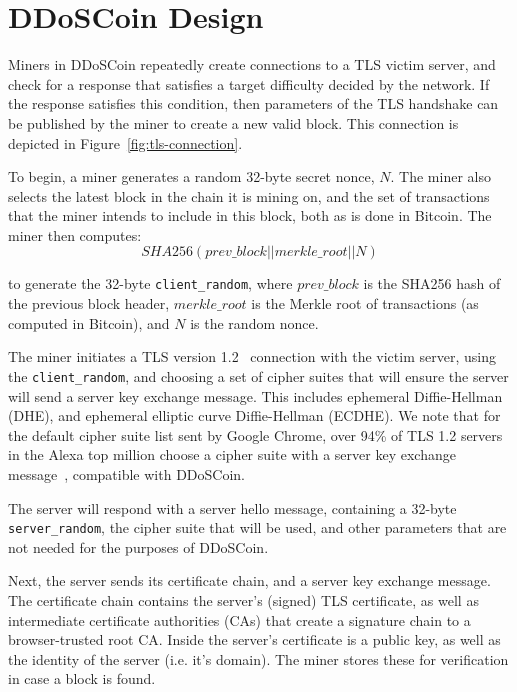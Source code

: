 \section{DDoSCoin Design}
\FigTLS

\FigOverview

Miners in DDoSCoin repeatedly create connections to a TLS victim server, and
check for a response that satisfies a target difficulty decided by the network.
If the response satisfies this condition, then parameters of the TLS handshake
can be published by the miner to create a new valid block. This connection is
depicted in Figure~\ref{fig:tls-connection}.

To begin, a miner generates a random 32-byte secret nonce, $N$. The miner also
selects the latest block in the chain it is mining on, and the set of
transactions that the miner intends to include in this block, both as is done in
Bitcoin. The miner then computes:
\begin{equation}
SHA256(prev\_block || merkle\_root || N)
\end{equation}

to generate the 32-byte \texttt{client\_random}, where $prev\_block$ is
the SHA256 hash of the previous block header, $merkle\_root$ is the
Merkle root of transactions (as computed in Bitcoin), and $N$ is the random nonce.

The miner initiates a TLS version 1.2~\cite{rfc5246} connection with the victim
server, using the \texttt{client\_random}, and choosing a set of cipher suites
that will ensure the server will send a server key exchange message. This
includes ephemeral Diffie-Hellman (DHE), and ephemeral elliptic curve
Diffie-Hellman (ECDHE). We note that for the default cipher suite list sent by
Google Chrome, over 94\% of TLS 1.2 servers in the Alexa top million choose a
cipher suite with a server key exchange message~\cite{censys}, compatible with
DDoSCoin.


The server will respond with a server hello message, containing a 32-byte
\texttt{server\_random}, the cipher suite that will be used, and other
parameters that are not needed for the purposes of DDoSCoin.

Next, the server sends its certificate chain, and a server key exchange message.
The certificate chain contains the server's (signed) TLS certificate, as well as
intermediate certificate authorities (CAs) that create a signature chain to a
browser-trusted root CA. Inside the server's certificate is a public
key, as well as the identity of the server (i.e. it's domain). The miner stores
these for verification in case a block is found.

